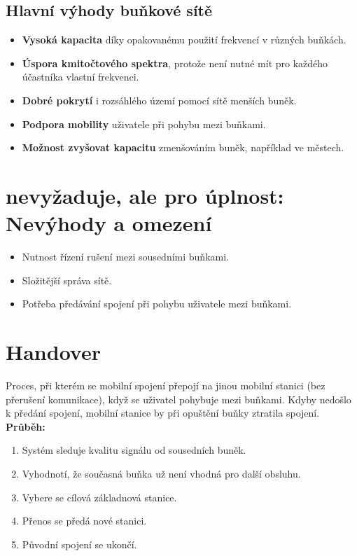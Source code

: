 \subsection{Hlavní výhody buňkové sítě}
\begin{itemize}
	\item \textbf{Vysoká kapacita} díky opakovanému použití frekvencí v různých buňkách.
	\item \textbf{Úspora kmitočtového spektra}, protože není nutné mít pro každého účastníka vlastní frekvenci.
	\item \textbf{Dobré pokrytí} i rozsáhlého území pomocí sítě menších buněk.
	\item \textbf{Podpora mobility} uživatele při pohybu mezi buňkami.
	\item \textbf{Možnost zvyšovat kapacitu} zmenšováním buněk, například ve městech.
\end{itemize}

\section{nevyžaduje, ale pro úplnost: Nevýhody a omezení}
\begin{itemize}
	\item Nutnost řízení rušení mezi sousedními buňkami.
	\item Složitější správa sítě.
	\item Potřeba předávání spojení při pohybu uživatele mezi buňkami.
\end{itemize}

\section{Handover}
Proces, při kterém se mobilní spojení přepojí na jinou mobilní stanici (bez přerušení komunikace), když se uživatel pohybuje mezi buňkami. Kdyby nedošlo k předání spojení, mobilní stanice by při opuštění buňky ztratila spojení.\\
\textbf{Průběh:}
\begin{enumerate}
	\item Systém sleduje kvalitu signálu od sousedních buněk.
	\item Vyhodnotí, že současná buňka už není vhodná pro další obsluhu.
	\item Vybere se cílová základnová stanice.
	\item Přenos se předá nové stanici.
	\item Původní spojení se ukončí.
\end{enumerate}
